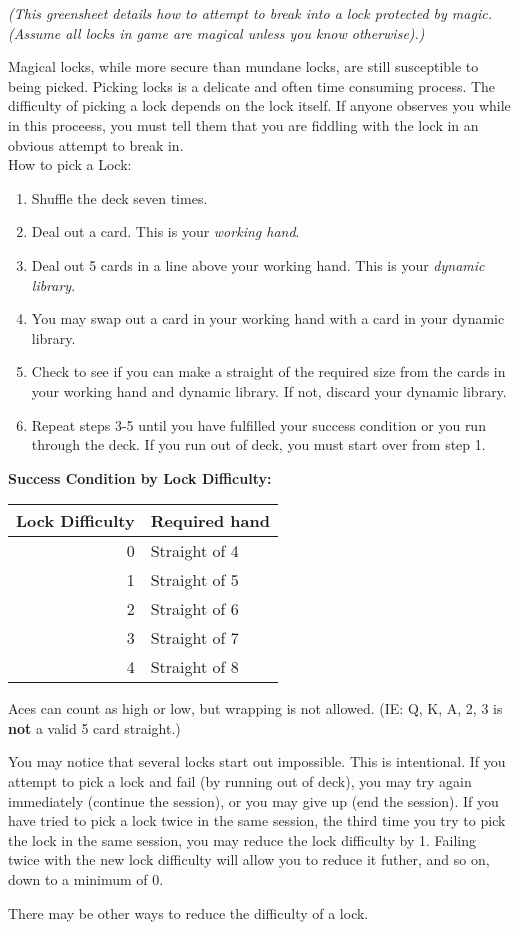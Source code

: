 \documentclass[green]{NeptuneBall}
\begin{document}
\name{\gDecking{}}

\emph{(This greensheet details how to attempt to break into a lock protected by magic. (Assume all locks in game are magical unless you know otherwise).)}

Magical locks, while more secure than mundane locks, are still susceptible to being picked. Picking locks is a delicate and often time consuming process. The difficulty of picking a lock depends on the lock itself. If anyone observes you while in this proceess, you must tell them that you are fiddling with the lock in an obvious attempt to break in.\\

How to pick a Lock:
\begin{enumerate}
	\item Shuffle the deck seven times.
	\item Deal out a card. This is your {\em working hand}.
	\item Deal out 5 cards in a line above your working hand. This is your {\em dynamic library}.
	\item You may swap out a card in your working hand with a card in your dynamic library.
	\item Check to see if you can make a straight of the required size from the cards in your working hand and dynamic library. If not, discard your dynamic library.
	\item Repeat steps 3-5 until you have fulfilled your success condition or you run through the deck.  If you run out of deck, you must start over from step 1.
\end{enumerate}

{\bf Success Condition by Lock Difficulty:}\\
\begin{tabular}{||r|l||}
\hline\hline
Lock Difficulty	& Required hand\\
\hline
0	& Straight of 4\\
1	& Straight of 5\\
2	& Straight of 6\\
3	& Straight of 7\\
4	& Straight of 8\\
\hline\hline 
\end{tabular}

\vspace{10 mm}

Aces can count as high or low, but wrapping is not allowed. (IE: Q, K, A, 2, 3 is {\bf not} a valid 5 card straight.)

You may notice that several locks start out impossible. This is intentional. If you attempt to pick a lock and fail (by running out of deck), you may try again immediately (continue the session), or you may give up (end the session). If you have tried to pick a lock twice in the same session, the third time you try to pick the lock in the same session, you may reduce the lock difficulty by 1. Failing twice with the new lock difficulty will allow you to reduce it futher, and so on, down to a minimum of 0.

There may be other ways to reduce the difficulty of a lock.
\end{document}
